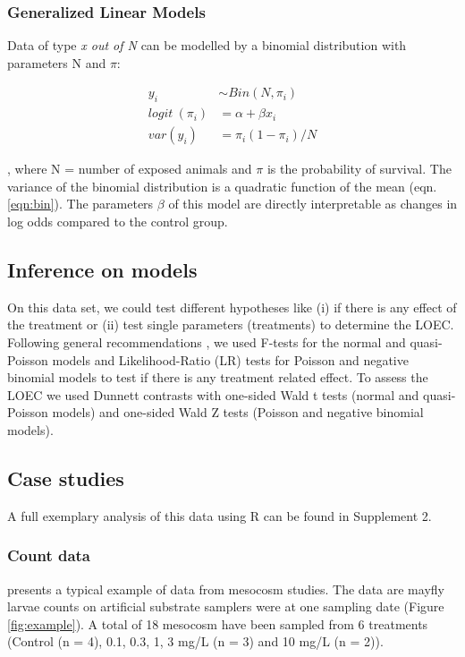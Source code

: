 \documentclass{scrartcl}
\begin{document}
\subsubsection{Generalized Linear Models}
Data of type \emph{x out of N} can be modelled by a binomial distribution with parameters N and $\pi$:

\begin{align}
  y_i &\sim Bin(N, \pi_i) \nonumber \\
  logit~(\pi_i) &= \alpha + \beta x_i \label{eqn:bin} \\
  var(y_i) &=  \pi_i (1 - \pi_i) / N \nonumber
\end{align}

, where N = number of exposed animals and $\pi$ is the probability of survival.
The variance of the binomial distribution is a quadratic function of the mean (eqn. \ref{eqn:bin}).
The parameters $\beta$ of this model are directly interpretable as changes in log odds compared to the control group.


\subsection{Inference on models}
On this data set, we could test different hypotheses like (i) if there is any effect of the treatment or (ii) test single parameters (treatments) to determine the LOEC.
Following general recommendations \citep{bolker_generalized_2009}, we used F-tests for the normal and quasi-Poisson models and Likelihood-Ratio (LR) tests for Poisson and negative binomial models to test if there is any treatment related effect.
To assess the LOEC we used Dunnett contrasts with one-sided Wald t tests (normal and quasi-Poisson models) and one-sided Wald Z tests (Poisson and negative binomial models).


\subsection{Case studies}
A full exemplary analysis of this data using R \citep{r_core_team_r:_2014} can be found in Supplement 2. 

\subsubsection{Count data}
\citet{brock_minimum_2015} presents a typical example of data from mesocosm studies.
The data are mayfly larvae counts on artificial substrate samplers were at one sampling date (Figure \ref{fig:example}). 
A total of 18 mesocosm have been sampled from 6 treatments (Control (n = 4), 0.1, 0.3, 1, 3 mg/L (n = 3) and 10 mg/L (n = 2)).
\end{document}
